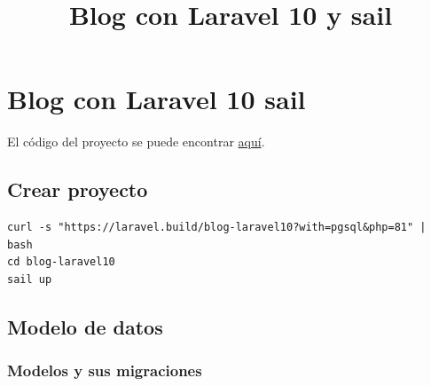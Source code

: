 \documentclass[11pt]{article}
\date{}
\title{Blog con Laravel 10 y sail}
\begin{document}
\maketitle
\setcounter{tocdepth}{3}
\tableofcontents

\setlength\parindent{10pt}


\section{Blog con Laravel 10 sail}
\label{sec:org044b4cb}
El código del proyecto se puede encontrar \href{https://github.com/IES-Rafael-Alberti/blog-laravel9.git}{aquí}.


\subsection{Crear proyecto}
\label{sec:org8e0110b}
\begin{verbatim}
curl -s "https://laravel.build/blog-laravel10?with=pgsql&php=81" | bash
cd blog-laravel10
sail up
\end{verbatim}

\subsection{Modelo de datos}
\label{sec:org02a7f68}
\subsubsection{Modelos y sus migraciones}
\label{sec:org5d473d0}
\end{document}
